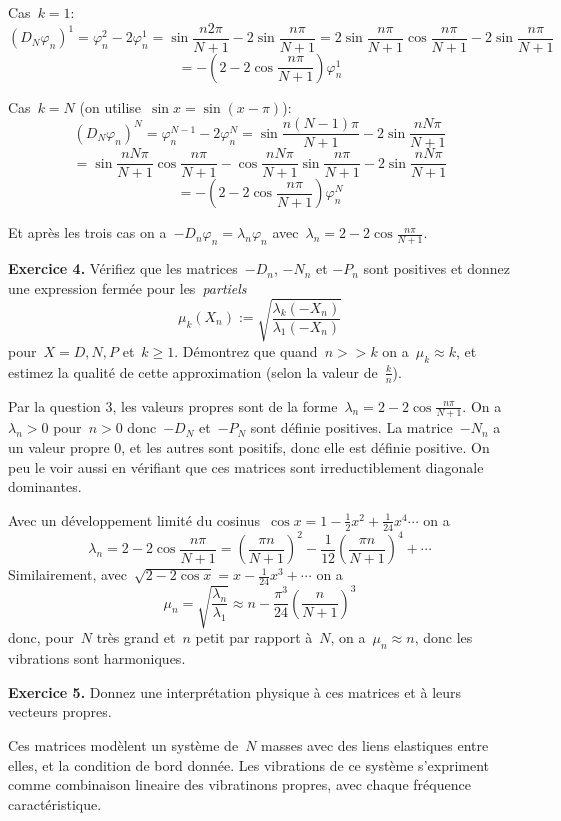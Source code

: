 Cas~$k=1$:
\[
	(D_N\varphi_n)^1 = \varphi_n^2-2\varphi_n^1
	=
	\sin\frac{n2\pi}{N+1}
	-2 \sin\frac{n\pi}{N+1}
	=
	2\sin\frac{n\pi}{N+1}\cos\frac{n\pi}{N+1}-2\sin\frac{n\pi}{N+1}
\]
\[
	=-\left(2-2\cos\frac{n\pi}{N+1}\right)\varphi_n^1
\]

Cas~$k=N$ (on utilise~$\sin x=\sin(x-\pi)$):
\[
	(D_N\varphi_n)^N = \varphi_n^{N-1}-2\varphi_n^N
	=
	\sin\frac{n(N-1)\pi}{N+1}
	-2 \sin\frac{nN\pi}{N+1}
\]
\[
	=
	\sin\frac{nN\pi}{N+1}\cos\frac{n\pi}{N+1}
	-\cos\frac{nN\pi}{N+1}\sin\frac{n\pi}{N+1}
	-2\sin\frac{nN\pi}{N+1}
\]
\[
	=-\left(2-2\cos\frac{n\pi}{N+1}\right)\varphi_n^N
\]

Et après les trois cas on a~$-D_n\varphi_n=\lambda_n\varphi_n$
avec~$\lambda_n=2-2\cos\frac{n\pi}{N+1}$.


{\color{blue}
{\bf Exercice 4.}
Vérifiez que les matrices~$-D_n$, $-N_n$ et $-P_n$ sont positives et donnez une
expression fermée pour les~\emph{partiels}
\[
	\mu_k(X_n) := \sqrt{\frac{\lambda_k(-X_n)}{\lambda_1(-X_n)}}
\]
pour~$X=D,N,P$ et~$k\ge 1$.  Démontrez que quand~$n>>k$ on a~$\mu_k\approx k$,
et estimez la qualité de cette approximation (selon la valeur de~$\tfrac kn$).
}

Par la question 3, les valeurs propres
sont de la forme~$\lambda_n=2-2\cos\frac{n\pi}{N+1}$.  On a~$\lambda_n>0$
pour~$n>0$ donc~$-D_N$ et~$-P_N$ sont définie positives.  La matrice~$-N_n$ a
un valeur propre 0, et les autres sont positifs, donc elle est définie
positive.  On peu le voir aussi en vérifiant que ces matrices sont
irreductiblement diagonale dominantes.

Avec un développement limité du cosinus~$\cos
x=1-\tfrac12x^2+\tfrac1{24}x^4\cdots$ on a
\[
	\lambda_n
	=
	2-2\cos\frac{n\pi}{N+1}
	=
	\left(\frac{\pi n}{N+1}\right)^2
	-\frac1{12}
	\left(\frac{\pi n}{N+1}\right)^4
	+\cdots
\]
Similairement, avec~$\sqrt{2-2\cos x}=x-\frac1{24}x^3+\cdots$ on a
\[
	\mu_n=\sqrt{\frac{\lambda_n}{\lambda_1}}
	\approx n-\frac{\pi^3}{24}\left(\frac{n}{N+1}\right)^3
\]
donc, pour~$N$ très grand et~$n$ petit par rapport à~$N$, on a~$\mu_n\approx
n$, donc les vibrations sont harmoniques.

{\color{blue}
{\bf Exercice 5.}
Donnez une interprétation physique à ces matrices et à leurs vecteurs propres.
}

Ces matrices modèlent un système de~$N$ masses avec des liens elastiques entre
elles, et la condition de bord donnée.  Les vibrations de ce système
s'expriment comme combinaison lineaire des vibratinons propres, avec chaque
fréquence caractéristique.

